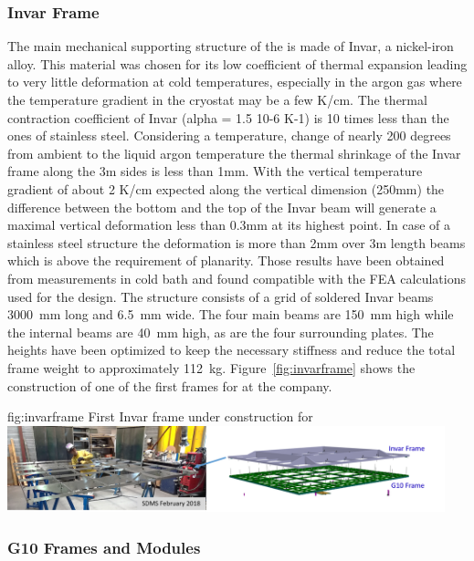 \subsubsection{Invar Frame}

The main mechanical supporting structure of the  is made of Invar, a nickel-iron alloy. This material was chosen for its low coefficient of thermal expansion leading to very little deformation at cold temperatures, especially in the argon gas where the temperature gradient in the cryostat may be a few \si{K/cm}. 
The thermal contraction coefficient of Invar (alpha =  1.5 10-6 K-1) is 10 times less than the ones of stainless steel.  Considering a temperature, change of nearly 200 degrees from ambient to the liquid argon temperature the thermal shrinkage of the Invar frame along the 3m sides is less than 1mm.  With the vertical temperature gradient of about 2 K/cm  expected along the vertical dimension (250mm)  the difference between the bottom and the top of the Invar beam will generate a maximal vertical deformation less than 0.3mm at its highest point. In case of a stainless steel structure the deformation is more than 2mm over 3m length beams which is above the requirement of planarity. Those results have been obtained from measurements in cold bath and found compatible with the FEA calculations used for the  design.
The structure consists of a grid of soldered Invar beams \SI{3000}{mm} long and \SI{6.5}{mm} wide. The four main beams are \SI{150}{mm} high while the internal beams are \SI{40}{mm} high, as are the four surrounding plates. The heights have been optimized to keep the necessary stiffness and reduce the total frame weight to approximately \SI{112}{kg}.
 Figure~\ref{fig:invarframe} shows the construction of one of the first  frames for  at the company.
\begin{dunefigure}{fig:invarframe}
{First  Invar frame under construction for }
\includegraphics[width=0.95\textwidth]{graphics/invar-framev2}
\end{dunefigure}
 \subsubsection{G10 Frames and Modules}
\label{sec:invar-frame}

